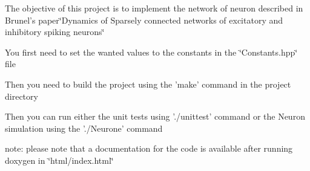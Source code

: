 The objective of this project is to implement the network of neuron described in Brunel's paper\char`\"{}\-Dynamics of Sparsely connected networks of excitatory and inhibitory spiking neurons\char`\"{}

You first need to set the wanted values to the constants in the \char`\"{}\-Constants.\-hpp\char`\"{} file

Then you need to build the project using the 'make' command in the project directory

Then you can run either the unit tests using './unittest' command or the Neuron simulation using the './\-Neurone' command

note\-: please note that a documentation for the code is available after running doxygen in \char`\"{}html/index.\-html\char`\"{} 